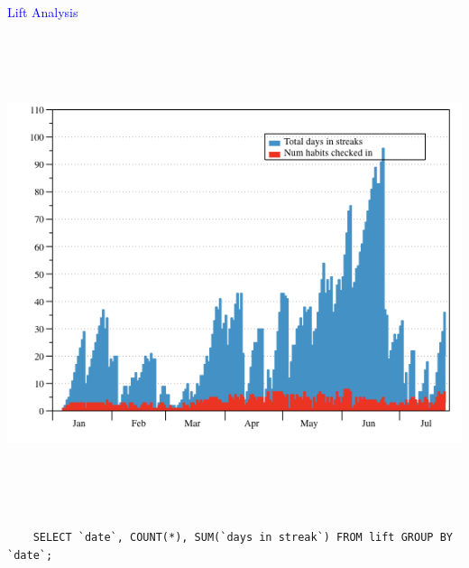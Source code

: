 \documentclass[landscape]{slides}
\begin{document}
\begin{slide}

    \textcolor{blue}{\Large{Lift Analysis}}

    \begin{center}
        \includegraphics[height=14cm]{lift-checkins-and-streaks}
    \end{center}


    \begin{small}
        \begin{verbatim}
    SELECT `date`, COUNT(*), SUM(`days in streak`) FROM lift GROUP BY `date`;
        \end{verbatim}
    \end{small}

\end{slide}
\end{document}
